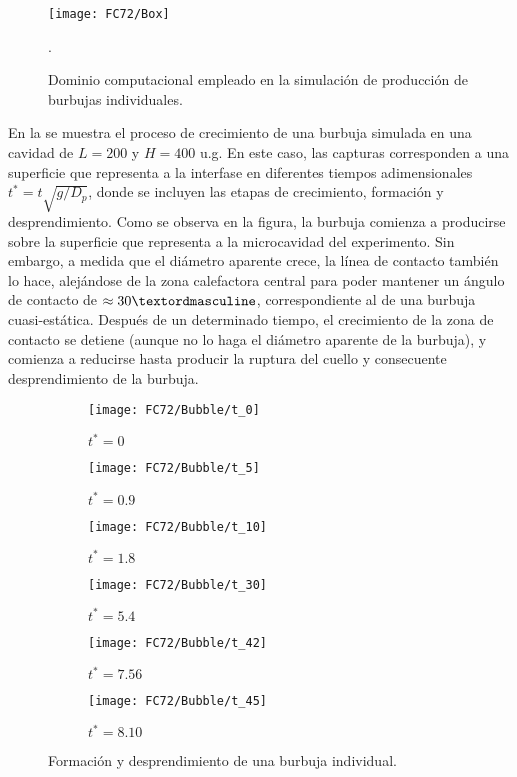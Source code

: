 \begin{figure}[ht]
	\centering
	\texttt{[image: FC72/Box]}
	\caption{Dominio computacional empleado en la simulaci\'on de producci\'on de burbujas individuales.}.
	\label{fig:dominio_hutter}
\end{figure}


En la  se muestra el proceso de crecimiento de una burbuja  simulada en una cavidad de $L=200$ y $H=400$ u.g. En este caso, las capturas corresponden a una superficie que representa a la interfase en diferentes tiempos adimensionales $t^*=t\sqrt{g/D_p}$, donde se incluyen las etapas de crecimiento, formaci\'on y desprendimiento. Como se observa en la figura, la burbuja comienza a producirse sobre la superficie que representa a la microcavidad del experimento. Sin embargo, a medida que el di\'ametro aparente crece, la l\'inea de contacto tambi\'en lo hace, alej\'andose de la zona calefactora central para poder mantener un \'angulo de contacto de $\approx 30\textordmasculine$, correspondiente al de una burbuja cuasi-est\'atica. Despu\'es de un determinado tiempo, el crecimiento de la zona de contacto se detiene (aunque no lo haga el di\'ametro aparente de la burbuja), y comienza a reducirse hasta producir la ruptura del cuello y consecuente desprendimiento de la burbuja. 

\begin{figure}[htb]
    \centering
    \begin{subfigure}[t]{0.45\textwidth}
        \centering
        \texttt{[image: FC72/Bubble/t\_0]}
        \caption{$t^*=0$}
    \end{subfigure}
    \vspace{3mm}
    \begin{subfigure}[t]{0.45\textwidth}
        \centering
        \texttt{[image: FC72/Bubble/t\_5]}
        \caption{$t^*=0.9$}
    \end{subfigure}
    \begin{subfigure}[t]{0.45\textwidth}
        \centering
        \texttt{[image: FC72/Bubble/t\_10]}
        \caption{$t^*=1.8$}
    \end{subfigure}
    \vspace{3mm}    
    \begin{subfigure}[t]{0.45\textwidth}
        \centering
        \texttt{[image: FC72/Bubble/t\_30]}
        \caption{$t^*=5.4$}
    \end{subfigure}
    \begin{subfigure}[t]{0.45\textwidth}
        \centering
        \texttt{[image: FC72/Bubble/t\_42]}
        \caption{$t^*=7.56$}
    \end{subfigure}
    \begin{subfigure}[t]{0.45\textwidth}
        \centering
        \texttt{[image: FC72/Bubble/t\_45]}
        \caption{$t^*=8.10$}
    \end{subfigure}            
    \caption{Formaci\'on y desprendimiento de una burbuja individual.}
    \label{fig:burbuja_nu_11}
\end{figure}
\FloatBarrier

